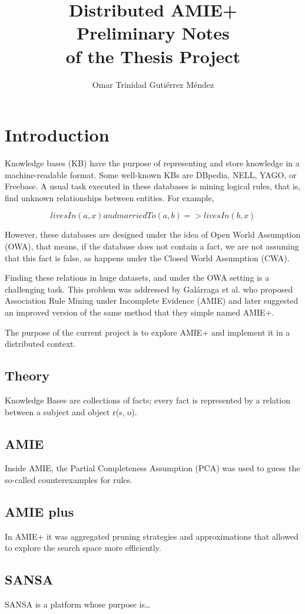 \documentclass{article}
\title{
Distributed AMIE+\\
\large Preliminary Notes\\
of the Thesis Project\\
}
\author{Omar Trinidad Guti\'errez M\'endez}
\begin{document}
\maketitle

\section{Introduction}

Knowledge bases (KB) have the purpose of representing and store knowledge in a machine-readable format. Some well-known KBs are DBpedia, NELL, YAGO, or Freebase. A usual task executed in these databases is mining logical rules, that is, find unknown relationships between entities. For example,

\begin{equation*}
livesIn(a, x) and marriedTo(a, b) => livesIn(b, x) 
\end{equation*}

However,  these databases are designed under the idea of Open World Assumption (OWA), that means, if the database does not contain a fact, we are not assuming that this fact is false, as happens under the Closed World Assumption (CWA).  

Finding these relations in huge datasets, and under the OWA setting is a challenging task. This problem was addressed by Galárraga et al. who proposed Association Rule Mining under Incomplete Evidence (AMIE) and later suggested an improved version of the same method that they simple named AMIE+. 

The purpose of the current project is to explore AMIE+ and implement it in a distributed context.

\subsection{Theory}

Knowledge Bases are collections of facts; every fact is represented by a relation between a subject and object r(s, o).

\subsection{AMIE}

Inside AMIE, the Partial Completeness Assumption (PCA) was used to guess the so-called counterexamples for rules. 

\subsection{AMIE plus}

In AMIE+ it was aggregated pruning strategies and approximations that allowed to explore the search space more efficiently.

\subsection{SANSA}

SANSA is a platform whose purpose is\ldots
\end{document}
